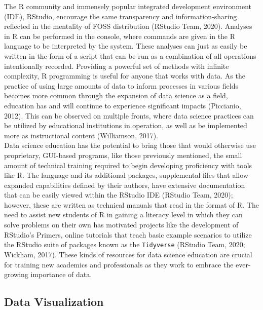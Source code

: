 \documentclass[english,man,floatsintext]{apa6}
\begin{document}
The R community and immensely popular integrated development environment (IDE), RStudio, encourage the same transparency and information-sharing reflected in the mentality of FOSS distribution (RStudio Team, 2020). Analyses in R can be performed in the console, where commands are given in the R language to be interpreted by the system. These analyses can just as easily be written in the form of a script that can be run as a combination of all operations intentionally recorded. Providing a powerful set of methods with infinite complexity, R programming is useful for anyone that works with data. As the practice of using large amounts of data to inform processes in various fields becomes more common through the expansion of data science as a field, education has and will continue to experience significant impacts (Piccianio, 2012). This can be observed on multiple fronts, where data science practices can be utilized by educational institutions in operation, as well as be implemented more as instructional content (Williamson, 2017).\\
Data science education has the potential to bring those that would otherwise use proprietary, GUI-based programs, like those previously mentioned, the small amount of technical training required to begin developing proficiency with tools like R. The language and its additional packages, supplemental files that allow expanded capabilities defined by their authors, have extensive documentation that can be easily viewed within the RStudio IDE (RStudio Team, 2020); however, these are written as technical manuals that read in the format of R. The need to assist new students of R in gaining a literacy level in which they can solve problems on their own has motivated projects like the development of RStudio's Primers, online tutorials that teach basic example scenarios to utilize the RStudio suite of packages known as the \texttt{Tidyverse} (RStudio Team, 2020; Wickham, 2017). These kinds of resources for data science education are crucial for training new academics and professionals as they work to embrace the ever-growing importance of data.

\hypertarget{data-visualization}{%
\subsection{Data Visualization}\label{data-visualization}}
\end{document}
